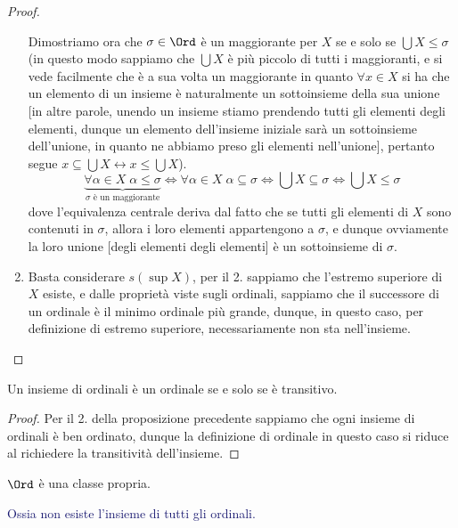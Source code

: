 \documentclass[11pt]{scrartcl}
\begin{document}
\begin{proof}
\begin{enumerate}[1.]
\begin{itemize}
		\end{itemize}
		Dimostriamo ora che $\sigma \in \Ord$ è un maggiorante per $X$ se e solo se $\bigcup X \leq \sigma$ (in questo modo sappiamo che $\bigcup X$ è più piccolo di tutti i maggioranti, e si vede facilmente che è a sua volta un maggiorante in quanto $\forall x \in X$ si ha che un elemento di un insieme è naturalmente un sottoinsieme della sua unione [in altre parole, unendo
		un insieme stiamo prendendo tutti gli elementi degli elementi, dunque un elemento dell'insieme iniziale sarà un sottoinsieme dell'unione, in quanto ne abbiamo preso gli elementi nell'unione], pertanto segue $x \subseteq \bigcup X \leftrightarrow x \leq \bigcup X$).
		\[ \underbrace{\forall \alpha \in X \; \alpha \leq \sigma}_{\text{$\sigma$ è un maggiorante}} \iff \forall \alpha \in X \; \alpha \subseteq \sigma \iff \bigcup X \subseteq \sigma \iff \bigcup X \leq \sigma 
			\]
		dove l'equivalenza centrale deriva dal fatto che se tutti gli elementi di $X$ sono contenuti in $\sigma$, allora i loro elementi appartengono a $\sigma$, e dunque ovviamente la loro unione [degli elementi degli elementi] è un sottoinsieme di $\sigma$.
		\item Basta considerare $s(\sup X)$, per il 2. sappiamo che l'estremo superiore di $X$ esiste, e dalle proprietà viste sugli ordinali, sappiamo che il successore di un ordinale è il minimo ordinale più grande, dunque, in questo caso, per definizione di estremo superiore, necessariamente non sta nell'insieme.
	\end{enumerate}
\end{proof}

\begin{corollary}
	Un insieme di ordinali è un ordinale se e solo se è transitivo.
\end{corollary}

\begin{proof}
	Per il 2. della proposizione precedente sappiamo che ogni insieme di ordinali è ben ordinato, dunque la definizione di ordinale in questo caso si riduce al richiedere la transitività dell'insieme.
\end{proof}

\begin{corollary}
	$\Ord$ è una classe propria.
\end{corollary}

\textcolor{MidnightBlue}{Ossia non esiste l'insieme di tutti gli ordinali.}
\end{document}
